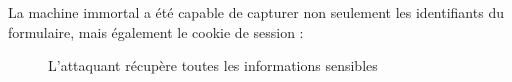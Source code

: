 La machine immortal a été capable de capturer non seulement les identifiants du formulaire, mais également le cookie de session :

\begin{figure}[H]
  \caption{L'attaquant récupère toutes les informations sensibles}
\end{figure}
